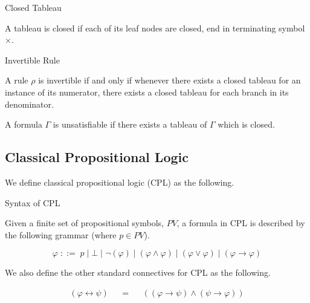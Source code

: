 \documentclass{llncs}
\begin{document}
\begin{definition}{Closed Tableau}\label{Closed Tableau}

A tableau is closed if each of its leaf nodes are closed, end in terminating
symbol $\times$.
\end{definition}

\begin{definition}{Invertible Rule}\label{Invertible Rule}

A rule $\rho$ is invertible if and only if whenever there exists a closed
tableau for an instance of its numerator, there exists a closed tableau for
each branch in its denominator.
\end{definition}

\begin{definition}

A formula $\Gamma$ is unsatisfiable if there exists a tableau of $\Gamma$ which
is closed.
\end{definition}

\subsection{Classical Propositional Logic}

We define classical propositional logic (CPL) as the following.

\begin{definition}{Syntax of CPL}\label{Syntax of CPL}

Given a finite set of propositional symbols, $PV$, a formula in CPL is
described by the following grammar (where $p \in PV$).

\begin{equation*}
\varphi \; ::= \; p \; \vert \; \bot \; \vert \; \neg (\varphi) \; \vert \;
(\varphi \wedge \varphi) \; \vert \; (\varphi \vee \varphi) \; \vert \;
(\varphi \rightarrow \varphi)
\end{equation*}

We also define the other standard connectives for CPL as the following.

$$
\begin{array}{rlcll}
(\varphi \leftrightarrow \psi) &&=&& ((\varphi \rightarrow \psi) \wedge (\psi
\rightarrow \varphi)) \\
\end{array}
$$
\end{definition}
\end{document}
